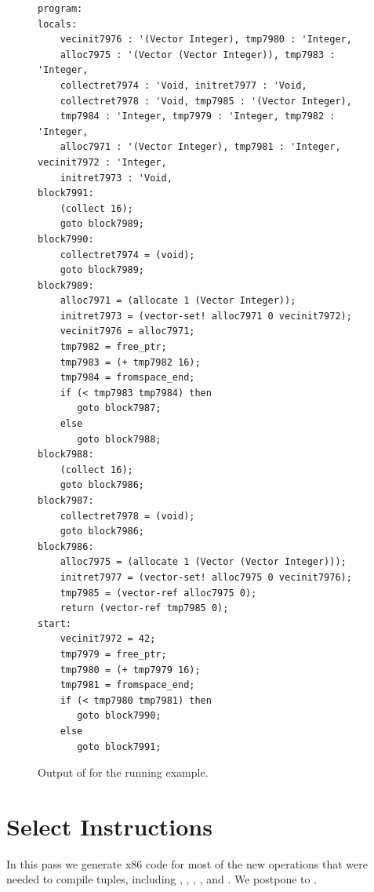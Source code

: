 \documentclass[11pt]{book}
\begin{document}
\begin{figure}[tbp]
\begin{lstlisting}
program:
locals:
    vecinit7976 : '(Vector Integer), tmp7980 : 'Integer,
    alloc7975 : '(Vector (Vector Integer)), tmp7983 : 'Integer,
    collectret7974 : 'Void, initret7977 : 'Void,
    collectret7978 : 'Void, tmp7985 : '(Vector Integer),
    tmp7984 : 'Integer, tmp7979 : 'Integer, tmp7982 : 'Integer,
    alloc7971 : '(Vector Integer), tmp7981 : 'Integer, vecinit7972 : 'Integer,
    initret7973 : 'Void, 
block7991:
    (collect 16);
    goto block7989;
block7990:
    collectret7974 = (void);
    goto block7989;
block7989:
    alloc7971 = (allocate 1 (Vector Integer));
    initret7973 = (vector-set! alloc7971 0 vecinit7972);
    vecinit7976 = alloc7971;
    tmp7982 = free_ptr;
    tmp7983 = (+ tmp7982 16);
    tmp7984 = fromspace_end;
    if (< tmp7983 tmp7984) then
       goto block7987;
    else
       goto block7988;
block7988:
    (collect 16);
    goto block7986;
block7987:
    collectret7978 = (void);
    goto block7986;
block7986:
    alloc7975 = (allocate 1 (Vector (Vector Integer)));
    initret7977 = (vector-set! alloc7975 0 vecinit7976);
    tmp7985 = (vector-ref alloc7975 0);
    return (vector-ref tmp7985 0);
start:
    vecinit7972 = 42;
    tmp7979 = free_ptr;
    tmp7980 = (+ tmp7979 16);
    tmp7981 = fromspace_end;
    if (< tmp7980 tmp7981) then
       goto block7990;
    else
       goto block7991;
\end{lstlisting}
\caption{Output of  for the running example.}
\label{fig:uncover-locals-r3}
\end{figure}

\clearpage

\section{Select Instructions}
\label{sec:select-instructions-gc}


In this pass we generate x86 code for most of the new operations that
were needed to compile tuples, including ,
, , , and
. We postpone  to .
\end{document}
